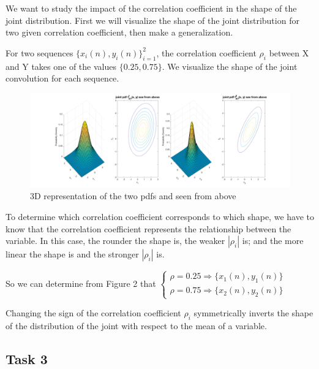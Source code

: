 \documentclass[onecolumn, 12pt]{IEEEtran}
\begin{document}
We want to study the impact of the correlation coefficient in the shape of the joint distribution. First we will visualize the shape of the joint distribution for two given correlation coefficient, then make a generalization.
\newline

\begin{multicols}{2}
For two sequences $\{x_i(n), y_i(n)\}_{i=1}^2$, the correlation coefficient $\rho_i$ between X and Y takes one of the values $\{0.25, 0.75\}$. We visualize the shape of the joint convolution for each sequence.
\begin{figure}[H]
	\centering
	\includegraphics[scale = 0.1]{Task2.png}
	\caption{3D representation of the two pdfs and seen from above}
\label{fig:Fig2}
\end{figure}

\end{multicols}

To determine which correlation coefficient corresponds to which shape, we have to know that the correlation coefficient represents the relationship between the variable. In this case, the rounder the shape is, the weaker $|\rho_i|$ is; and the more linear the shape is and the stronger $|\rho_i|$ is.

So we can determine from Figure 2 that $\begin{cases}\rho = 0.25 \Rightarrow \{x_1(n), y_1(n)\} \\ \rho = 0.75 \Rightarrow \{x_2(n), y_2(n)\}
	\end{cases}$
\newline

Changing the sign of the correlation coefficient $\rho_i$ symmetrically inverts the shape of the distribution of the joint with respect to the mean of a variable.

\subsection*{Task 3}
\end{document}
